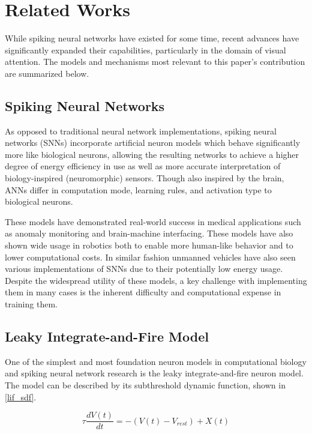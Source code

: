 \documentclass[../main.tex]{subfiles}
\begin{document}
\section{Related Works}
\label{sec:rel}
While spiking neural networks have existed for some time, recent advances have significantly expanded their capabilities, particularly in the domain of visual attention. The models and mechanisms most relevant to this paper's contribution are summarized below.

\subsection{Spiking Neural Networks}
As opposed to traditional neural network implementations, spiking neural networks (SNNs) incorporate artificial neuron models which behave significantly more like biological neurons, allowing the resulting networks to achieve a higher degree of energy efficiency in use as well as more accurate interpretation of biology-inspired (neuromorphic) sensors\cite{training}. Though also inspired by the brain, ANNs differ in computation mode, learning rules, and activation type to biological neurons.\cite{single} 

\par These models have demonstrated real-world success in medical applications such as anomaly monitoring and brain-machine interfacing\cite{training}. These models have also shown wide usage in robotics both to enable more human-like behavior and to lower computational costs\cite{training}. In similar fashion unmanned vehicles have also seen various implementations of SNNs due to their potentially low energy usage\cite{training}. Despite the widespread utility of these models, a key challenge with implementing them in many cases is the inherent difficulty and computational expense in training them\cite{single}. 

\subsection{Leaky Integrate-and-Fire Model}
One of the simplest and most foundation neuron models in computational biology and spiking neural network research is the leaky integrate-and-fire neuron model. The model can be described by its subthreshold dynamic function, shown in \eqref{lif_sdf}\cite{plif}.

\begin{equation}\label{lif_sdf}
\tau\frac{dV(t)}{dt}=-\left(V(t)-V_{rest}\right)+X(t)
\end{equation}
\end{document}
